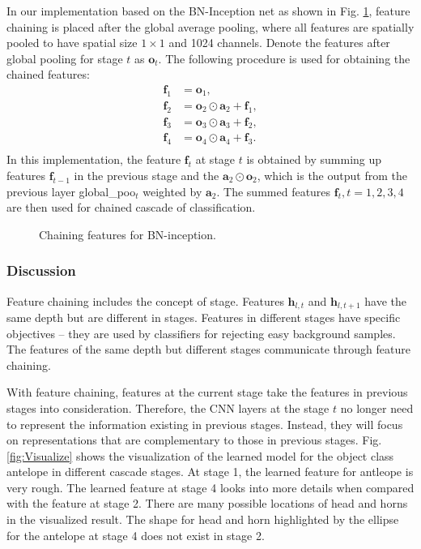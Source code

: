 \documentclass[10pt,twocolumn,letterpaper]{article}
\begin{document}
In our implementation based on the BN-Inception net as shown in Fig. \ref{fig:CascadeBN}, feature chaining is placed after the global average pooling, where all features are spatially pooled to have spatial size $1\times 1$  and 1024 channels. 
 Denote the features after global pooling  for stage $t$ as $\mathbf{o}_t$.
 The following procedure is used for obtaining the chained features:
\begin{equation}
\begin{split}
\mathbf{f}_{1} &=  \mathbf{o}_1, \\
\mathbf{f}_{2} &=  \mathbf{o}_{2} \odot  \mathbf{a}_2 + \mathbf{f}_1, \\
\mathbf{f}_{3} &=  \mathbf{o}_{3} \odot  \mathbf{a}_3 + \mathbf{f}_2, \\
\mathbf{f}_{4} &=  \mathbf{o}_{4} \odot  \mathbf{a}_4 + \mathbf{f}_3.\\
\end{split}
\end{equation}
In this implementation, the feature $\mathbf{f}_{t}$ at stage $t$ is obtained by summing up features $\mathbf{f}_{t-1}$ in the previous stage and the $\mathbf{a}_2 \odot \mathbf{o}_2$, which is the output from the previous layer global\_poo$_t$ weighted by $\mathbf{a}_2$.
The summed features $\mathbf{f}_t, t= 1, 2, 3, 4$ are then used for chained cascade of classification. 



\begin{figure}
\begin{center}
 \centerline{}
\end{center}
\vspace{-10pt}
   \caption{Chaining features for BN-inception. }
\label{fig:CascadeBN}
\end{figure}

\subsubsection{Discussion}
Feature chaining includes the concept of stage.  Features $\mathbf{h}_{l, t}$ and $\mathbf{h}_{l, t+1}$ have the same depth but are different in stages. Features in different stages have specific objectives -- they are used by classifiers for rejecting easy background samples. The features of the same depth but different stages communicate through feature chaining.

With feature chaining, features at the current stage take the features in previous stages into consideration. Therefore, the CNN layers at the stage $t$ no longer need to represent the information existing in previous stages. Instead, they will focus  on representations that are complementary to those in previous stages. Fig. \ref{fig:Visualize} shows the visualization of the learned model for the object class antelope in different cascade stages. At stage 1, the learned feature for antleope is very rough. The learned feature at stage 4 looks into more details when compared with the feature at stage 2. There are many possible locations of head and horns in the visualized result. The shape for head and horn highlighted by the ellipse for the antelope at stage 4 does not exist in stage 2. 
\end{document}
